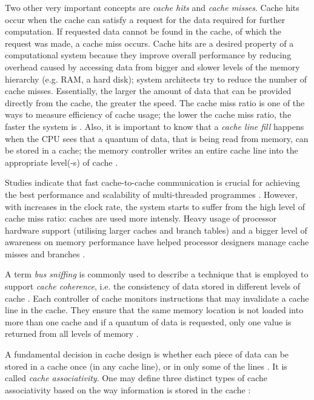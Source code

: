 Two other very important concepts are \textit{cache hits} and \textit{cache misses}. Cache hits occur when the cache can satisfy a request for the data required for further computation. If requested data cannot be found in the cache, of which the request was made, a cache miss occurs. Cache hits are a desired property of a computational system because they improve overall performance by reducing overhead caused by accessing data from bigger and slower levels of the memory hierarchy (e.g. RAM, a hard disk); system architects try to reduce the number of cache misses. Essentially, the larger the amount of data that can be provided directly from the cache, the greater the speed. The cache miss ratio is one of the ways to measure efficiency of cache usage; the lower the cache miss ratio, the faster the system is \cite{Chen2007}. Also, it is important to know that a \textit{cache line fill} happens when the CPU sees that a quantum of data, that is being read from memory, can be stored in a cache; the memory controller writes an entire cache line into the appropriate level(-s) of cache \cite{Intel2014}.

Studies indicate that fast cache-to-cache communication is crucial for achieving the best performance and scalability of multi-threaded programmes \cite{Molka2009,Lo2013,Zhang2010}. However, with increases in the clock rate, the system starts to suffer from the high level of cache miss ratio: caches are used more intensly. Heavy usage of processor hardware support (utilising larger caches and branch tables) and a bigger level of awareness on memory performance have helped processor designers manage cache misses and branches \cite{Jagtap2009}.

A term \textit{bus sniffing} is commonly used to describe a technique that is employed to support \textit{cache coherence}, i.e. the consistency of data stored in different levels of cache \cite{Hennessy2006}. Each controller of cache monitors instructions that may invalidate a cache line in the cache. They ensure that the same memory location is not loaded into more than one cache and if a quantum of data is requested, only one value is returned from all levels of memory \cite{Neupane2004}.

A fundamental decision in cache design is whether each piece of data can be stored in a cache once (in any cache line), or in only some of the lines \cite{Ostrovsky2010}. It is called \textit{cache associativity}. One may define three distinct types of cache associativity based on the way information is stored in the cache \cite{Hennessy2006}:

